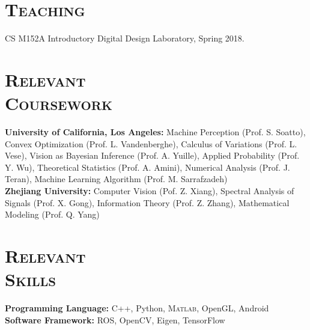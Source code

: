 \documentclass[margin, line, 10pt]{res} %
\begin{document}
\begin{resume}
\section{\textsc{Teaching}}
CS M152A Introductory Digital Design Laboratory, Spring 2018.

\section{\textsc{Relevant\\Coursework}}
\textbf{University of California, Los Angeles:} Machine Perception (Prof. S. Soatto), Convex Optimization (Prof. L. Vandenberghe), Calculus of Variations (Prof. L. Vese), Vision as Bayesian Inference (Prof. A. Yuille), Applied Probability (Prof. Y. Wu), Theoretical Statistics (Prof. A. Amini), Numerical Analysis (Prof. J. Teran), Machine Learning Algorithm (Prof. M. Sarrafzadeh)\\
\textbf{Zhejiang University:} Computer Vision (Pof. Z. Xiang), Spectral Analysis of Signals (Prof. X. Gong), Information Theory (Prof. Z. Zhang), Mathematical Modeling (Prof. Q. Yang)

\section{\textsc{Relevant\\Skills}}
\textbf{Programming Language:} C++, Python, \textsc{Matlab}, OpenGL, Android\\
\textbf{Software Framework:} ROS, OpenCV, Eigen, TensorFlow


\end{resume}
\end{document}
